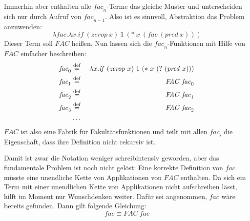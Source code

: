 Immerhin aber enthalten alle $\mathit{fac}_n$-Terme das
gleiche Muster und unterscheiden sich nur durch Aufruf von
$\mathit{fac}_{n-1}$.  Also ist es sinnvoll, Abstraktion
das Problem anzuwenden:
%
\begin{displaymath}
  \lambda\mathit{fac}.\lambda x.\mathit{if}~(\mathit{zerop}~x)~1~(\ast~x~(\mathit{fac}~(\mathit{pred}~x)))
\end{displaymath}
%
Dieser Term soll $\mathit{FAC}$ heißen.  Nun lassen sich die
$\mathit{fac}_n$-Funktionen mit Hilfe von $\mathit{FAC}$ einfacher beschreiben:
%
\begin{eqnarray*}
   \mathit{fac}_0 &\stackrel{\rm def}{=}{}& \lambda x.\mathit{if}~(\mathit{zerop}~x)~1~(\ast~x~(?~(\mathit{pred}~x)))\\
   \mathit{fac}_1 &\stackrel{\rm def}{=}{}& \mathit{FAC}~\mathit{fac}_0\\
   \mathit{fac}_2 &\stackrel{\rm def}{=}{}& \mathit{FAC}~\mathit{fac}_1\\
   \mathit{fac}_3 &\stackrel{\rm def}{=}{}& \mathit{FAC}~\mathit{fac}_2\\
   &\ldots&
\end{eqnarray*}
%
$\mathit{FAC}$ ist also eine Fabrik für Fakultätsfunktionen und
teilt mit allen $\mathit{fac}_i$ die Eigenschaft, dass ihre
Definition nicht rekursiv ist.

Damit ist zwar die Notation weniger schreibintensiv geworden,
aber das fundamentale Problem ist noch nicht gelöst: Eine korrekte
Definition von $\mathit{fac}$ müsste eine unendliche
Kette von Applikationen von $\mathit{FAC}$ enthalten.
Da sich ein Term mit einer unendlichen Kette von Applikationen nicht aufschreiben lässt, hilft im Moment nur Wunschdenken weiter.
Dafür sei angenommen, $\mathit{fac}$ wäre bereits gefunden.  Dann gilt folgende
Gleichung:
%
\begin{displaymath}
  \mathit{fac} \equiv \mathit{FAC}~\mathit{fac}
\end{displaymath}

